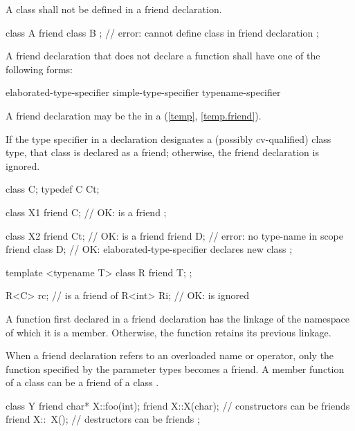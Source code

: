 A class shall not be defined in a friend declaration. \begin{example}
\begin{codeblock}
class A {
  friend class B { };           // error: cannot define class in friend declaration
};
\end{codeblock}
\end{example}

\pnum
A friend declaration that does not declare a function
shall have one of the following forms:

\begin{ncsimplebnf}
 elaborated-type-specifier \terminal{;}\br
{} simple-type-specifier \terminal{;}\br
{} typename-specifier \terminal{;}
\end{ncsimplebnf}

\begin{note} A friend declaration may be the
 in a 
(\ref{temp}, \ref{temp.friend}).\end{note} If the
type specifier in a  declaration designates a (possibly
cv-qualified) class type, that class is declared as a friend; otherwise, the
friend declaration is ignored. \begin{example}

\begin{codeblock}
class C;
typedef C Ct;

class X1 {
  friend C;                     // OK:  is a friend
};

class X2 {
  friend Ct;                    // OK:  is a friend
  friend D;                     // error: no type-name  in scope
  friend class D;               // OK: elaborated-type-specifier declares new class
};

template <typename T> class R {
  friend T;
};

R<C> rc;                        //  is a friend of 
R<int> Ri;                      // OK:  is ignored
\end{codeblock}
\end{example}

\pnum
{}%
A function first declared in a friend declaration
has the linkage of the namespace of which it is a member.
Otherwise, the function retains its previous linkage.

\pnum
{}%
When a friend
declaration refers to an overloaded name or operator, only the function specified
by the parameter types becomes a friend.
A member function of a class
can be a friend of
a class
.
%
\begin{example}

\begin{codeblock}
class Y {
  friend char* X::foo(int);
  friend X::X(char);            // constructors can be friends
  friend X::~X();               // destructors can be friends
};
\end{codeblock}
\end{example}

